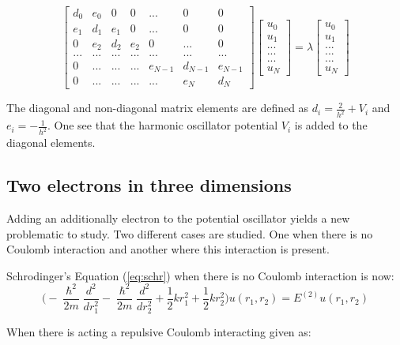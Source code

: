 \documentclass{article}
\begin{document}
\[
\begin{bmatrix}
	d_0 & e_0 & 0 & 0 & ... & 0 & 0 \\
	e_1 & d_1 & e_1 & 0 & ... & 0 & 0 \\
	0 & e_2 & d_2 & e_2 & 0 & ... & 0 \\
	... & ... & ... & ... & ... & ... & ... \\
	0 & ... & ... & ... & e_{N-1} & d_{N-1} & e_{N-1} \\
	0 & ... & ... & ... & ... & e_N & d_N
\end{bmatrix}
\begin{bmatrix}
	u_0 \\  u_1 \\ ... \\ ... \\ ... \\ u_N  
\end{bmatrix}
= \lambda
\begin{bmatrix}
    u_0 \\  u_1 \\ ... \\ ... \\ ... \\ u_N
\end{bmatrix}
\]

The diagonal and non-diagonal matrix elements are defined as $d_i = \frac{2}{h^2}+V_i$ and $e_i = -\frac{1}{h^2}$. One see that the harmonic oscillator potential $V_i$ is added to the diagonal elements. 

\subsection{Two electrons in three dimensions}
Adding an additionally electron to the potential oscillator yields a new problematic to study. Two different cases are studied. One when there is no Coulomb interaction and another where this interaction is present.  

\medskip

Schrodinger's Equation (\ref{eq:schr}) when there is no Coulomb interaction is now:
\begin{equation}
\bigg(-\frac{\hslash^2}{2m}\frac{d^2}{dr_1^2}-\frac{\hslash^2}{2m}\frac{d^2}{dr_2^2}+ \frac{1}{2}kr_1^2 + \frac{1}{2}kr_2^2\bigg)u(r_1,r_2) = E^{(2)}u(r_1,r_2)
\end{equation}

\medskip

When there is acting a repulsive Coulomb interacting given as:
\end{document}
